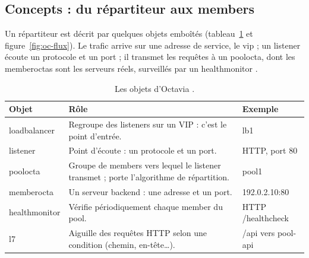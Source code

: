 \subsection{Concepts : du répartiteur aux members}\label{sec:oc-concepts}

Un répartiteur est décrit par quelques objets emboîtés (tableau~\ref{tab:oc-objets} et figure~\ref{fig:oc-flux}). Le trafic
arrive sur une adresse de service, le \gls{vip} ; un \gls{listener} écoute un protocole et un port ; il transmet les requêtes
à un \gls{poolocta}, dont les \glspl{memberocta} sont les serveurs réels, surveillés par un \gls{healthmonitor}
\parencite{octavia-glossary}.

\begin{table}[!ht]
\centering
\renewcommand{\arraystretch}{1.3}
\begin{tabular}{@{}>{\raggedright\arraybackslash}p{3.0cm}>{\raggedright\arraybackslash}p{8.4cm}>{\raggedright\arraybackslash\ttfamily\small}p{4.1cm}@{}}
\toprule
\textbf{Objet} & \textbf{Rôle} & \textrm{\textbf{Exemple}} \\
\midrule
\Gls{loadbalancer} & Regroupe des listeners sur un VIP : c'est le point d'entrée. & lb1 \\
\Gls{listener} & Point d'écoute : un protocole et un port. & HTTP, port 80 \\
\Gls{poolocta} & Groupe de members vers lequel le listener transmet ; porte l'algorithme de répartition. & pool1 \\
\Gls{memberocta} & Un serveur backend : une adresse et un port. & 192.0.2.10:80 \\
\Gls{healthmonitor} & Vérifie périodiquement chaque member du pool. & HTTP /healthcheck \\
\Gls{l7} & Aiguille des requêtes HTTP selon une condition (chemin, en-tête\dots). & /api vers pool-api \\
\bottomrule
\end{tabular}
\caption{Les objets d'Octavia \parencite{octavia-glossary}.}
\label{tab:oc-objets}
\end{table}

